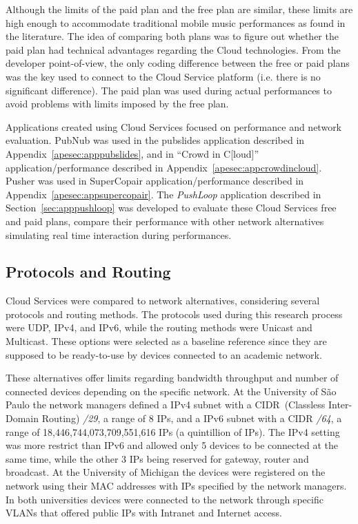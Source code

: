 Although the limits of the paid plan and the free plan are similar, these limits are high enough to accommodate traditional mobile music performances as found in the literature. 
The idea of comparing both plans was to figure out whether the paid plan had technical advantages regarding the Cloud technologies.
From the developer point-of-view, the only coding difference between the free or paid plans was the key used to connect to the Cloud Service platform (i.e. there is no significant difference).
The paid plan was used during actual performances to avoid problems with limits imposed by the free plan.

Applications created using Cloud Services focused on performance and network evaluation.
PubNub was used in the pubslides application described in Appendix~\ref{apesec:apppubslides}, and in ``Crowd in C[loud]'' application/performance described in Appendix~\ref{apesec:appcrowdincloud}.
Pusher was used in SuperCopair application/performance described in Appendix~\ref{apesec:appsupercopair}.
The \textit{PushLoop} application described in Section~\ref{sec:apppushloop} was developed to evaluate these Cloud Services free and paid plans, compare their performance with other network alternatives simulating real time interaction during performances.

\subsection*{Protocols and Routing}

Cloud Services were compared to network alternatives, considering several protocols and routing methods.
The protocols used during this research process were UDP, IPv4, and IPv6, while the routing methods were Unicast and Multicast.
These options were selected as a baseline reference since they are supposed to be ready-to-use by devices connected to an academic network.

These alternatives offer limits regarding bandwidth throughput and number of connected devices depending on the specific network.
At the University of São Paulo the network managers defined a IPv4 subnet with a CIDR~(Classless Inter-Domain Routing) \textit{/29}, a range of 8 IPs, and a IPv6 subnet with a CIDR \textit{/64}, a range of 18,446,744,073,709,551,616 IPs (a quintillion of IPs).
The IPv4 setting was more restrict than IPv6 and allowed only 5 devices to be connected at the same time, while the other 3 IPs being reserved for gateway, router and broadcast.
At the University of Michigan the devices were registered on the network using their MAC addresses with IPs specified by the network managers.
In both universities devices were connected to the network through specific VLANs that offered public IPs with Intranet and Internet access.

